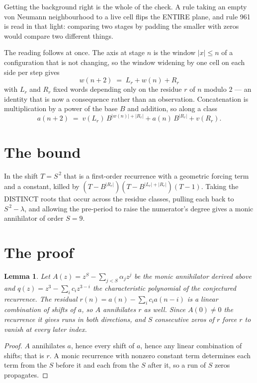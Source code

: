 \documentclass[11pt,a4paper]{article}
\theoremstyle{plain}
\newtheorem{lemma}[theorem]{Lemma}
\theoremstyle{definition}
\begin{document}
Getting the background right is the whole of the check. A rule taking an empty von Neumann
neighbourhood to a live cell flips the ENTIRE plane, and rule 961 is read
in that light: comparing two stages by padding the smaller with zeros would compare two
different things.

The reading follows at once. The axis at stage $n$ is the window $|x|\le n$ of a configuration
that is not changing, so the window widening by one cell on each side per step gives
\[
w(n+2)\;=\;L_r + w(n) + R_r
\]
with $L_r$ and $R_r$ fixed words depending only on the residue $r$ of $n$ modulo $2$ --- an
identity that is now a consequence rather than an observation. Concatenation is multiplication
by a power of the base $B$ and addition, so along a class
\[
a(n+2)\;=\;v(L_r)\,B^{|w(n)|+|R_r|} + a(n)\,B^{|R_r|} + v(R_r).
\]

\section{The bound}

In the shift $T=S^{\,2}$ that is a first-order recurrence with a geometric forcing term and a
constant, killed by $(T-B^{|R_r|})(T-B^{|L_r|+|R_r|})(T-1)$. Taking the DISTINCT roots that
occur across the residue classes, pulling each back to $S^{\,2}-\lambda$, and allowing the
pre-period to raise the numerator's degree gives a monic annihilator of order $S=9$.

\section{The proof}

\begin{lemma}\label{lem:crit}
Let $A(z)=z^S-\sum_{j<S}\alpha_jz^{j}$ be the monic annihilator derived above and
$q(z)=z^{3}-\sum_ic_iz^{3-i}$ the characteristic polynomial of the conjectured
recurrence. The residual $r(n)=a(n)-\sum_ic_ia(n-i)$ is a linear combination of shifts of $a$,
so $A$ annihilates $r$ as well. Since $A(0)\ne0$ the recurrence it gives runs in both
directions, and $S$ consecutive zeros of $r$ force $r$ to vanish at every later index.
\end{lemma}

\begin{proof}
$A$ annihilates $a$, hence every shift of $a$, hence any linear combination of shifts; that is
$r$. A monic recurrence with nonzero constant term determines each term from the $S$ before it
and each from the $S$ after it, so a run of $S$ zeros propagates.
\end{proof}
\end{document}
